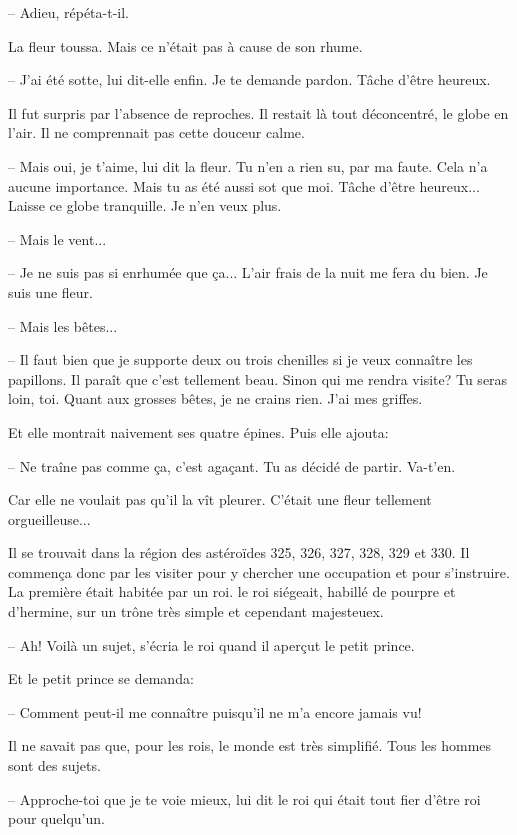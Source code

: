 \documentclass[a4paper]{report}
\begin{document}
-- Adieu, répéta-t-il.

La fleur toussa. Mais ce n'était pas à cause de son rhume.

-- J'ai été sotte, lui dit-elle enfin. Je te demande pardon. Tâche d'être heureux.

Il fut surpris par l'absence de reproches. Il restait là tout déconcentré, le globe en l'air. Il ne comprennait pas cette douceur calme.

-- Mais oui, je t'aime, lui dit la fleur. Tu n'en a rien su, par ma faute. Cela n'a aucune importance. Mais tu as été aussi sot que moi. Tâche d'être heureux... Laisse ce globe tranquille. Je n'en veux plus.

-- Mais le vent...

-- Je ne suis pas si enrhumée que ça... L'air frais de la nuit me fera du bien. Je suis une fleur.

-- Mais les bêtes...

-- Il faut bien que je supporte deux ou trois chenilles si je veux connaître les papillons. Il paraît que c'est tellement beau. Sinon qui me rendra visite? Tu seras loin, toi. Quant aux grosses bêtes, je ne crains rien. J'ai mes griffes.

Et elle montrait naivement ses quatre épines. Puis elle ajouta:

-- Ne traîne pas comme ça, c'est agaçant. Tu as décidé de partir. Va-t'en.

Car elle ne voulait pas qu'il la vît pleurer. C'était une fleur tellement orgueilleuse...

\parachapter{} %
Il se trouvait dans la région des astéroïdes 325, 326, 327, 328, 329 et 330. Il commença donc par les visiter pour y chercher une occupation et pour s'instruire.
La première était habitée par un roi. le roi siégeait, habillé de pourpre et d'hermine, sur un trône très simple et cependant majesteuex.

-- Ah! Voilà un sujet, s'écria le roi quand il aperçut le petit prince.

Et le petit prince se demanda:

-- Comment peut-il me connaître puisqu'il ne m'a encore jamais vu!

Il ne savait pas que, pour les rois, le monde est très simplifié. Tous les hommes sont des sujets.

-- Approche-toi que je te voie mieux, lui dit le roi qui était tout fier d'être roi pour quelqu'un.

\end{document}
